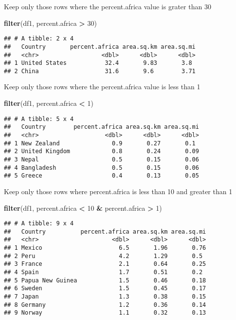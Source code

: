 \documentclass[
]{article}
\newenvironment{Shaded}{\begin{snugshade}}{\end{snugshade}}
\newcommand{\DecValTok}[1]{\textcolor[rgb]{0.00,0.00,0.81}{#1}}
\newcommand{\FunctionTok}[1]{\textcolor[rgb]{0.13,0.29,0.53}{\textbf{#1}}}
\newcommand{\NormalTok}[1]{#1}
\newcommand{\SpecialCharTok}[1]{\textcolor[rgb]{0.81,0.36,0.00}{\textbf{#1}}}
\begin{document}
Keep only those rows where the percent.africa value is grater than 30

\begin{Shaded}
\begin{Highlighting}[]
\FunctionTok{filter}\NormalTok{(df1, percent.africa }\SpecialCharTok{\textgreater{}} \DecValTok{30}\NormalTok{)}
\end{Highlighting}
\end{Shaded}

\begin{verbatim}
## # A tibble: 2 x 4
##   Country       percent.africa area.sq.km area.sq.mi
##   <chr>                  <dbl>      <dbl>      <dbl>
## 1 United States           32.4       9.83       3.8 
## 2 China                   31.6       9.6        3.71
\end{verbatim}

Keep only those rows where the percent.africa value is less than 1

\begin{Shaded}
\begin{Highlighting}[]
\FunctionTok{filter}\NormalTok{(df1, percent.africa }\SpecialCharTok{\textless{}} \DecValTok{1}\NormalTok{)}
\end{Highlighting}
\end{Shaded}

\begin{verbatim}
## # A tibble: 5 x 4
##   Country        percent.africa area.sq.km area.sq.mi
##   <chr>                   <dbl>      <dbl>      <dbl>
## 1 New Zealand               0.9       0.27       0.1 
## 2 United Kingdom            0.8       0.24       0.09
## 3 Nepal                     0.5       0.15       0.06
## 4 Bangladesh                0.5       0.15       0.06
## 5 Greece                    0.4       0.13       0.05
\end{verbatim}

Keep only those rows where percent.africa is less than 10 and greater
than 1

\begin{Shaded}
\begin{Highlighting}[]
\FunctionTok{filter}\NormalTok{(df1, percent.africa }\SpecialCharTok{\textless{}} \DecValTok{10} \SpecialCharTok{\&}\NormalTok{ percent.africa }\SpecialCharTok{\textgreater{}} \DecValTok{1}\NormalTok{)}
\end{Highlighting}
\end{Shaded}

\begin{verbatim}
## # A tibble: 9 x 4
##   Country          percent.africa area.sq.km area.sq.mi
##   <chr>                     <dbl>      <dbl>      <dbl>
## 1 Mexico                      6.5       1.96       0.76
## 2 Peru                        4.2       1.29       0.5 
## 3 France                      2.1       0.64       0.25
## 4 Spain                       1.7       0.51       0.2 
## 5 Papua New Guinea            1.5       0.46       0.18
## 6 Sweden                      1.5       0.45       0.17
## 7 Japan                       1.3       0.38       0.15
## 8 Germany                     1.2       0.36       0.14
## 9 Norway                      1.1       0.32       0.13
\end{verbatim}
\end{document}

